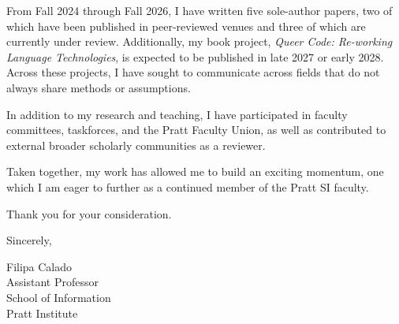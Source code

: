 \documentclass[12pt]{article}
\begin{document}
From Fall 2024 through Fall 2026, I have written five sole-author
papers, two of which have been published in peer-reviewed venues and
three of which are currently under review. Additionally, my book
project, \emph{Queer Code: Re-working Language Technologies}, is expected
to be published in late 2027 or early 2028. Across these projects, I
have sought to communicate across fields that do not always share
methods or assumptions.

In addition to my research and teaching, I have participated in
faculty committees, taskforces, and the Pratt Faculty Union, as well
as contributed to external broader scholarly communities as a
reviewer.

Taken together, my work has allowed me to build an exciting momentum,
one which I am eager to further as a continued member of the Pratt SI
faculty.

Thank you for your consideration.

Sincerely,
\vspace{\baselineskip}
\vspace{\baselineskip}
\vspace{\baselineskip}
\vspace{\baselineskip}

Filipa Calado \\[0pt]
Assistant Professor \\[0pt]
School of Information \\[0pt]
Pratt Institute
\end{document}
